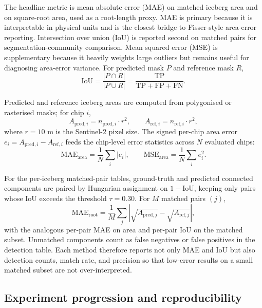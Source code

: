 \documentclass[review,jog]{igs}
\begin{document}
The headline metric is mean absolute error (MAE) on matched iceberg area and on square-root area, used as a root-length proxy. MAE is primary because it is interpretable in physical units and is the closest bridge to Fisser-style area-error reporting. Intersection over union (IoU) is reported second on matched pairs for segmentation-community comparison. Mean squared error (MSE) is supplementary because it heavily weights large outliers but remains useful for diagnosing area-error variance. For predicted mask $P$ and reference mask $R$,
\begin{equation}
\mathrm{IoU} = \frac{|P \cap R|}{|P \cup R|} = \frac{\mathrm{TP}}{\mathrm{TP} + \mathrm{FP} + \mathrm{FN}}.
\label{eq:iou}
\end{equation}

Predicted and reference iceberg areas are computed from polygonised or rasterised masks; for chip $i$,
\begin{equation}
A_{\mathrm{pred}, i} = n_{\mathrm{pred}, i} \cdot r^2, \qquad A_{\mathrm{ref}, i} = n_{\mathrm{ref}, i} \cdot r^2,
\label{eq:chip_area}
\end{equation}
where $r = 10$ m is the Sentinel-2 pixel size. The signed per-chip area error $e_i = A_{\mathrm{pred}, i} - A_{\mathrm{ref}, i}$ feeds the chip-level error statistics across $N$ evaluated chips:
\begin{equation}
\mathrm{MAE}_{\mathrm{area}} = \frac{1}{N} \sum_i |e_i|, \qquad \mathrm{MSE}_{\mathrm{area}} = \frac{1}{N} \sum_i e_i^2.
\label{eq:chip_mae_mse}
\end{equation}

For the per-iceberg matched-pair tables, ground-truth and predicted connected components are paired by Hungarian assignment on $1 - \mathrm{IoU}$, keeping only pairs whose IoU exceeds the threshold $\tau = 0.30$. For $M$ matched pairs $(j)$,
\begin{equation}
\mathrm{MAE}_{\mathrm{root}} = \frac{1}{M} \sum_j \left| \sqrt{A_{\mathrm{pred}, j}} - \sqrt{A_{\mathrm{ref}, j}} \right|,
\label{eq:pair_mae_root}
\end{equation}
with the analogous per-pair MAE on area and per-pair IoU on the matched subset. Unmatched components count as false negatives or false positives in the detection table. Each method therefore reports not only MAE and IoU but also detection counts, match rate, and precision so that low-error results on a small matched subset are not over-interpreted.

\subsection{Experiment progression and reproducibility}
\end{document}

